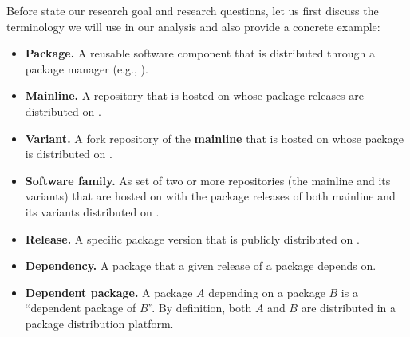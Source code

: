 Before state our research goal and research questions, let us first discuss the terminology we will use in our analysis and also provide a concrete example: 

\begin{itemize}
    \item \textbf{Package.} A reusable software component that is distributed through a package manager (e.g., \np).
    
    \item \textbf{Mainline.} A repository that is hosted on \gh 
    whose package releases are distributed on \npm.

    \item \textbf{Variant.} A fork repository of the \textbf{mainline} that is hosted on \gh whose package is distributed on \npm.

    \item \textbf{Software family.} As set of two or more repositories (the mainline and its variants) that are hosted on \gh with the package releases of both mainline and its variants distributed on \npm.

    
    \item \textbf{Release.} A specific package version that is publicly distributed on \npm.

     \item \textbf{Dependency.} A package that a given release of a package depends on.

    \item \textbf{Dependent package.}  A package $A$ depending on a package $B$ is a ``dependent package of $B$''. By definition, both $A$ and $B$ are distributed in a package distribution platform. %
    

\end{itemize}
